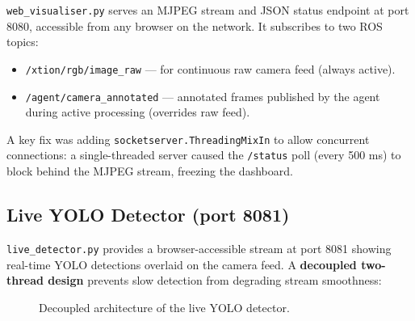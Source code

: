 \texttt{web\_visualiser.py} serves an MJPEG stream and JSON status endpoint at port 8080,
accessible from any browser on the network.
It subscribes to two ROS topics:

\begin{itemize}[noitemsep]
  \item \texttt{/xtion/rgb/image\_raw} — for continuous raw camera feed (always active).
  \item \texttt{/agent/camera\_annotated} — annotated frames published by the agent
        during active processing (overrides raw feed).
\end{itemize}

A key fix was adding \texttt{socketserver.ThreadingMixIn} to allow concurrent
connections: a single-threaded server caused the \texttt{/status} poll (every 500 ms)
to block behind the MJPEG stream, freezing the dashboard.

\subsection{Live YOLO Detector (port 8081)}

\texttt{live\_detector.py} provides a browser-accessible stream at port 8081 showing
real-time YOLO detections overlaid on the camera feed.
A \textbf{decoupled two-thread design} prevents slow detection from degrading stream
smoothness:

\begin{figure}[H]
\centering
{}
\caption{Decoupled architecture of the live YOLO detector.}
\label{fig:live_detector}
\end{figure}

